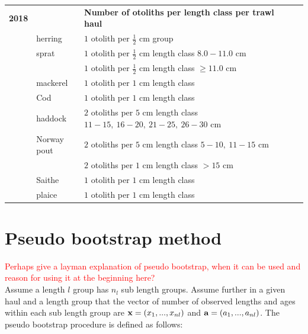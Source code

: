 \documentclass[a4paper 12pt]{article}
\numberwithin{equation}{section}
\newcommand{\ed}[1]{\textcolor{red}{#1}}
\begin{document}
\begin{small}
\begin{table}[h!]
\begin{tabularx}{\linewidth}{r l l l l X}
{\bf 2018} & & {\bf Number of otoliths per length class per trawl haul}  \\[1.0ex]
  & herring  &  $1$  otolith per $\frac{1}{2}$ cm group \\[0.5ex]
     & sprat    & $1$  otolith per $\frac{1}{2}$ cm length class  $8.0 -11.0$ cm\\[0.5ex]
              & & $1$  otolith per $\frac{1}{2}$ cm length class  $\geq 11.0$ cm\\[0.5ex]
& mackerel      & $1$  otolith per $1$ cm length class \\[0.5ex]
& Cod       	  & $1$  otolith per $1$ cm length class\\[0.5ex]
& haddock & $2$  otoliths per $5$ cm length class $11 -15, \ 16-20, \ 21-25, \ 26-30$ cm \\[0.5ex]
& Norway pout & $2$  otoliths per $5$ cm length class $5 -10, \ 11-15$ cm\\[0.5ex]
               & & $2$  otoliths per $1$ cm length class $> 15$ cm\\[1.0ex]
&Saithe        & $1$  otolith per $1$ cm length class \\[0.5ex]  
&plaice       & $1$  otolith per $1$ cm length class \\[0.1ex]
\bottomrule         
\end{tabularx}
\end{table}
\end{small}


\section{Pseudo bootstrap method}
\label{secAp:pseudobootstrap}
\ed{Perhaps give a layman explanation of pseudo bootstrap, when it can be used and reason for using it at the beginning here?}\\

Assume a length $l$ group has $n_{l}$ sub length groups. Assume further in a given haul and a length group that the vector of number of observed lengths and ages within each sub length group are ${\bf x} = \left(x_{1},...,x_{nl}\right)$ and ${\bf a} = \left(a_{1},...,a_{nl}\right)$.  The pseudo bootstrap procedure is defined as follows:
\end{document}
